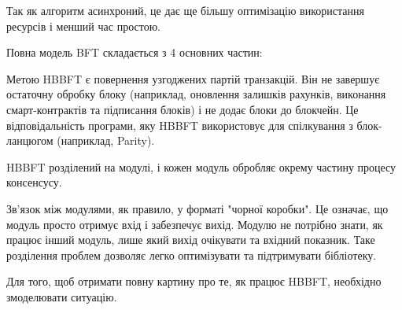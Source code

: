 \documentclass{lib/styles/default-style}
\begin{document}

    Так як алгоритм асинхроний, це дає ще більшу оптимізацію використання ресурсів і менший час простою.

    Повна модель BFT складається з 4 основних частин:

    

    Метою HBBFT є повернення узгоджених партій транзакцій.
    Він не завершує остаточну обробку блоку (наприклад, оновлення залишків рахунків, виконання смарт-контрактів та підписання блоків)
    і не додає блоки до блокчейн. Це відповідальність програми, яку HBBFT використовує для спілкування з блок-ланцюгом (наприклад, Parity).

    HBBFT розділений на модулі, і кожен модуль обробляє окрему частину процесу консенсусу.

    Зв'язок між модулями, як правило, у форматі "чорної коробки".
    Це означає, що модуль просто отримує вхід і забезпечує вихід.
    Модулю не потрібно знати, як працює інший модуль, лише який вихід очікувати та вхідний показник.
    Таке розділення проблем дозволяє легко оптимізувати та підтримувати бібліотеку.

    Для того, щоб отримати повну картину про те, як працює HBBFT, необхідно змоделювати ситуацію.
\end{document}
